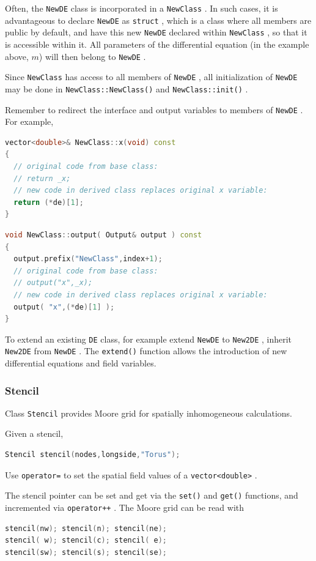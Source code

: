 \documentclass[12pt,a4paper]{article}
\newcommand{\type}[1]{{\small\small\tt #1} }
\begin{document}
Often, the \type{NewDE} class is incorporated in a \type{NewClass}. In such cases, it is advantageous to declare \type{NewDE} as \type{struct}, which is a class where all members are public by default, and have this new \type{NewDE} declared within \type{NewClass}, so that it is accessible within it. All parameters of the differential equation (in the example above, $m$) will then belong to \type{NewDE}.

Since \type{NewClass} has access to all members of \type{NewDE}, all initialization of \type{NewDE} may be done in \type{NewClass::NewClass()} and \type{NewClass::init()}.

Remember to redirect the interface and output variables to members of \type{NewDE}. For example,

\begin{lstlisting}[language=C++]
vector<double>& NewClass::x(void) const
{
  // original code from base class:
  // return _x;
  // new code in derived class replaces original x variable:
  return (*de)[1];
}
\end{lstlisting}

\begin{lstlisting}[language=C++]
void NewClass::output( Output& output ) const
{
  output.prefix("NewClass",index+1);
  // original code from base class:
  // output("x",_x);
  // new code in derived class replaces original x variable:
  output( "x",(*de)[1] );
}
\end{lstlisting}

To extend an existing \type{DE} class, for example extend \type{NewDE} to \type{New2DE}, inherit \type{New2DE} from \type{NewDE}. The \type{extend()} function allows the introduction of new differential equations and field variables.

\subsubsection{Stencil}
\label{sec:stencil}

Class \type{Stencil} provides Moore grid for spatially inhomogeneous calculations.

Given a stencil,
\begin{lstlisting}[language=C++]
Stencil stencil(nodes,longside,"Torus");
\end{lstlisting}

Use \type{operator=} to set the spatial field values of a \type{vector<double>}.

The stencil pointer can be set and get via the \type{set()} and \type{get()} functions, and incremented via \type{operator++}. The Moore grid can be read with
\begin{lstlisting}[language=C++]
stencil(nw); stencil(n); stencil(ne);
stencil( w); stencil(c); stencil( e);
stencil(sw); stencil(s); stencil(se);
\end{lstlisting}
\end{document}
